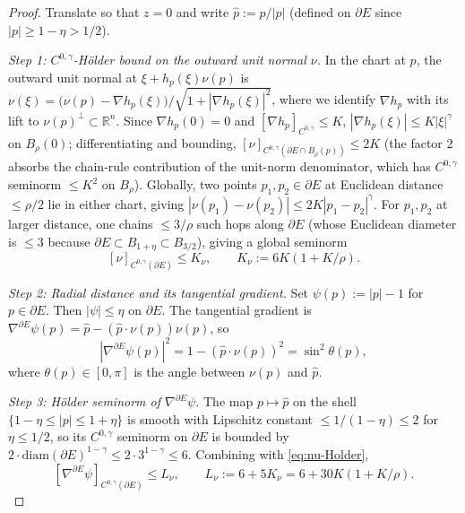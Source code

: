 \documentclass[11pt]{amsart}
\newcommand{\R}{\mathbb R}
\begin{document}
\begin{proof}
Translate so that \(z=0\) and write \(\widehat p:=p/|p|\) (defined
on \(\partial E\) since \(|p|\ge 1-\eta>1/2\)).

\emph{Step 1: $C^{0,\gamma}$-Hölder bound on the outward unit
normal $\nu$.}  In the chart at \(p\), the outward unit normal at
\(\xi+h_p(\xi)\nu(p)\) is
\(\nu(\xi)=\bigl(\nu(p)-\nabla h_p(\xi)\bigr)/\sqrt{1+|\nabla h_p
(\xi)|^2}\), where we identify \(\nabla h_p\) with its lift to
\(\nu(p)^\perp\subset\R^n\).  Since \(\nabla h_p(0)=0\) and
\([\nabla h_p]_{C^{0,\gamma}}\le K\), \(|\nabla h_p(\xi)|\le K|\xi
|^\gamma\) on \(B_\rho(0)\); differentiating and bounding,
\([\nu]_{C^{0,\gamma}(\partial E\cap B_\rho(p))}\le 2K\) (the factor
\(2\) absorbs the chain-rule contribution of the unit-norm
denominator, which has \(C^{0,\gamma}\) seminorm \(\le K^2\) on
\(B_\rho\)).  Globally, two points \(p_1,p_2\in\partial E\) at
Euclidean distance \(\le\rho/2\) lie in either chart, giving
\(|\nu(p_1)-\nu(p_2)|\le 2K|p_1-p_2|^\gamma\).  For \(p_1,p_2\) at
larger distance, one chains \(\le 3/\rho\) such hops along
\(\partial E\) (whose Euclidean diameter is \(\le 3\) because
\(\partial E\subset B_{1+\eta}\subset B_{3/2}\)), giving a global
seminorm
\begin{equation}\label{eq:nu-Holder}
   [\nu]_{C^{0,\gamma}(\partial E)}
      \le K_\nu,
   \qquad
   K_\nu:=6K(1+K/\rho).
\end{equation}

\emph{Step 2: Radial distance and its tangential gradient.}
Set \(\psi(p):=|p|-1\) for \(p\in\partial E\).  Then \(|\psi|\le
\eta\) on \(\partial E\).  The tangential gradient is
\(\nabla^{\partial E}\psi(p)=\widehat p-(\widehat p\cdot\nu(p))
\nu(p)\), so
\begin{equation}\label{eq:DEpsi-formula}
   |\nabla^{\partial E}\psi(p)|^{2}
      =1-(\widehat p\cdot\nu(p))^{2}
      =\sin^{2}\theta(p),
\end{equation}
where \(\theta(p)\in[0,\pi]\) is the angle between \(\nu(p)\) and
\(\widehat p\).

\emph{Step 3: Hölder seminorm of $\nabla^{\partial E}\psi$.}
The map \(p\mapsto\widehat p\) on the shell \(\{1-\eta\le|p|\le 1+
\eta\}\) is smooth with Lipschitz constant \(\le 1/(1-\eta)\le 2\)
for \(\eta\le 1/2\), so its \(C^{0,\gamma}\) seminorm on
\(\partial E\) is bounded by \(2\cdot\mathrm{diam}(\partial E)^{1
-\gamma}\le 2\cdot 3^{1-\gamma}\le 6\).  Combining with
\eqref{eq:nu-Holder},
\begin{equation}\label{eq:DEpsi-Holder}
   [\nabla^{\partial E}\psi]_{C^{0,\gamma}(\partial E)}
      \le L_\nu,
   \qquad
   L_\nu:=6+5 K_\nu=6+30 K(1+K/\rho).
\end{equation}


\end{proof}
\end{document}

